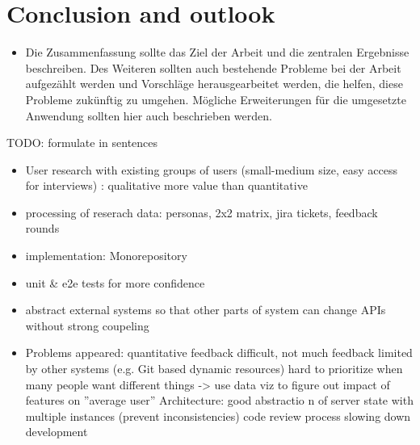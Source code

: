%
\chapter{Conclusion and outlook}
\label{chap:conclusion}      

\begin{itemize}
	\item Die Zusammenfassung sollte das Ziel der Arbeit und die zentralen Ergebnisse beschreiben. Des Weiteren sollten auch bestehende Probleme bei der Arbeit aufgezählt werden und Vorschläge herausgearbeitet werden, die helfen, diese Probleme zukünftig zu umgehen. Mögliche Erweiterungen für die umgesetzte Anwendung sollten hier auch beschrieben werden.
\end{itemize}

TODO: formulate in sentences
\begin{itemize}
	\item User research with existing groups of users (small-medium size, easy access for interviews) : qualitative more value than quantitative
	\item processing of reserach data: personas, 2x2 matrix, jira tickets, feedback rounds
	\item implementation: Monorepository
	\item unit \& e2e tests for more confidence
	\item abstract external systems so that other parts of system can change APIs without strong coupeling
	\item Problems appeared:
	\subitem quantitative feedback difficult, not much feedback
	\subitem limited by other systems (e.g. Git based dynamic resources)
	\subitem hard to prioritize when many people want different things -> use data viz to figure out impact of features on ''average user''
	\subitem Architecture: good abstractio	n of server state with multiple instances (prevent inconsistencies)
	\subitem code review process slowing down development
\end{itemize}